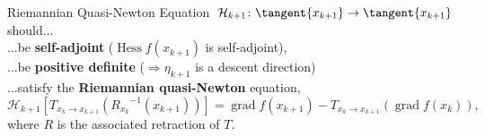 \documentclass[9pt]{beamer}
\begin{document}

\begin{frame}{Riemannian Quasi-Newton Equation}
    $\mathcal{H}_{k+1} \colon \tangent{x_{k+1}} \to \tangent{x_{k+1}}$ should... \\[0.5\baselineskip]
    ...be \textbf{self-adjoint} ($\operatorname{Hess} f(x_{k+1})$ is self-adjoint), \\[0.5\baselineskip]
    ...be \textbf{positive definite} ($\Rightarrow \eta_{k+1}$ is a descent direction) \\[0.5\baselineskip]
    ...satisfy the \textbf{Riemannian quasi-Newton} equation, 
    \begin{equation*}
            \mathcal{H}_{k+1} [T_{x_k \rightarrow x_{k+1}}({R_{x_k}}^{-1}(x_{k+1}))] = \operatorname{grad} f(x_{k+1}) - T_{x_k \rightarrow x_{k+1}}(\operatorname{grad} f(x_k)),
    \end{equation*} 
    where $R$ is the associated retraction of $T$.
\end{frame}
\end{document}
